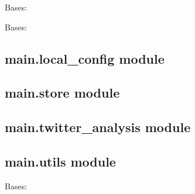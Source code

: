 \documentclass[letterpaper,10pt,english]{sphinxmanual}
\begin{document}

\begin{fulllineitems}
\label{main:main.geo.Place}
Bases: 

\end{fulllineitems}


\begin{fulllineitems}
\label{main:main.geo.Point}
Bases: 

\end{fulllineitems}


\begin{fulllineitems}
\label{main:main.geo.draw_map}
\end{fulllineitems}



\subsection{main.local\_config module}
\label{main:main-local-config-module}\label{main:module-main.local_config}

\subsection{main.store module}
\label{main:main-store-module}

\subsection{main.twitter\_analysis module}
\label{main:main-twitter-analysis-module}

\subsection{main.utils module}
\label{main:main-utils-module}\label{main:module-main.utils}

\begin{fulllineitems}
\label{main:main.utils.Stopwatch}
Bases: 

\begin{fulllineitems}
\label{main:main.utils.Stopwatch.start}
\end{fulllineitems}


\end{fulllineitems}
\end{document}
